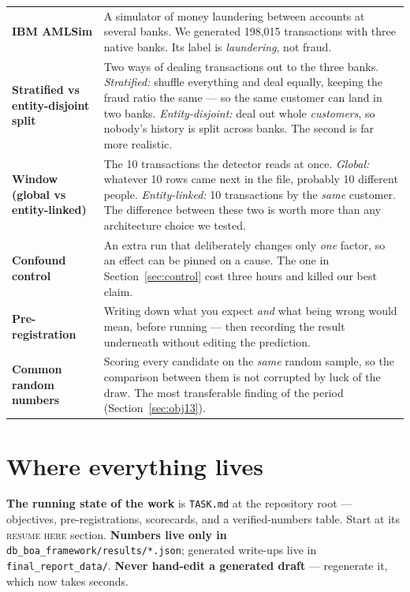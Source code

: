 \documentclass[11pt]{article}
\begin{document}
{\begin{xltabular}{\linewidth}{@{}p{3.5cm} X@{}}
\textbf{IBM AMLSim} & A simulator of money laundering between accounts at several banks. We generated 198{,}015 transactions with three native banks. Its label is \emph{laundering}, not fraud. \\
\textbf{Stratified vs entity-disjoint split} & Two ways of dealing transactions out to the three banks. \emph{Stratified:} shuffle everything and deal equally, keeping the fraud ratio the same --- so the same customer can land in two banks. \emph{Entity-disjoint:} deal out whole \emph{customers}, so nobody's history is split across banks. The second is far more realistic. \\
\textbf{Window (global vs entity-linked)} & The 10 transactions the detector reads at once. \emph{Global:} whatever 10 rows came next in the file, probably 10 different people. \emph{Entity-linked:} 10 transactions by the \emph{same} customer. The difference between these two is worth more than any architecture choice we tested. \\
\textbf{Confound control} & An extra run that deliberately changes only \emph{one} factor, so an effect can be pinned on a cause. The one in Section~\ref{sec:control} cost three hours and killed our best claim. \\
\textbf{Pre-registration} & Writing down what you expect \emph{and} what being wrong would mean, before running --- then recording the result underneath without editing the prediction. \\
\textbf{Common random numbers} & Scoring every candidate on the \emph{same} random sample, so the comparison between them is not corrupted by luck of the draw. The most transferable finding of the period (Section~\ref{sec:obj13}). \\
\bottomrule
\end{xltabular}}

\section{Where everything lives}

\textbf{The running state of the work} is \texttt{TASK.md} at the repository root --- objectives,
pre-registrations, scorecards, and a verified-numbers table. Start at its \textsc{resume here} section.
\textbf{Numbers live only in} \texttt{db\_boa\_framework/results/*.json}; generated write-ups live in
\texttt{final\_report\_data/}. \textbf{Never hand-edit a generated draft} --- regenerate it, which now
takes seconds.
\end{document}
